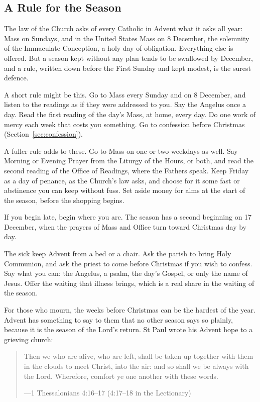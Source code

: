 \subsection{A Rule for the Season}\label{sec:rule}

The law of the Church asks of every Catholic
in Advent what it asks all year: Mass on Sundays, and in the United States Mass
on 8 December, the solemnity of the Immaculate Conception, a holy day of
obligation. Everything else is offered. But a season kept without any plan
tends to be swallowed by December, and a rule, written down before the First
Sunday and kept modest, is the surest defence.

A short rule might be this. Go to Mass every Sunday and on 8 December, and
listen to the readings as if they were addressed to you. Say the Angelus once a
day. Read the first reading of the day's Mass, at home, every day. Do one work
of mercy each week that costs you something. Go to confession before Christmas
(Section~\ref{sec:confession}).

A fuller rule adds to these. Go to Mass on one or two weekdays as well. Say
Morning or Evening Prayer from the Liturgy of the Hours, or both, and read the
second reading of the Office of Readings, where the Fathers speak. Keep Friday
as a day of penance, as the Church's law asks, and choose for it some fast or
abstinence you can keep without fuss. Set aside money for alms at the start of
the season, before the shopping begins.

If you begin late, begin where you are. The season has a second beginning on 17
December, when the prayers of Mass and Office turn toward Christmas day by
day.

The sick keep Advent from a bed or a chair. Ask the parish to bring Holy
Communion, and ask the priest to come before Christmas if you wish to confess.
Say what you can: the Angelus, a psalm, the day's Gospel, or only the name of
Jesus. Offer the waiting that illness brings, which is a real share in the
waiting of the season.

For those who mourn, the weeks before Christmas can be the hardest of the year.
Advent has something to say to them that no other season says so plainly,
because it is the season of the Lord's return. St Paul wrote his Advent hope to
a grieving church:

\begin{quote}
Then we who are alive, who are left, shall be taken up together with them in
the clouds to meet Christ, into the air: and so shall we be always with the
Lord. Wherefore, comfort ye one another with these words.\par
{\smallskip\noindent\small ---1 Thessalonians 4:16--17 (4:17--18 in the Lectionary)\par}
\end{quote}

